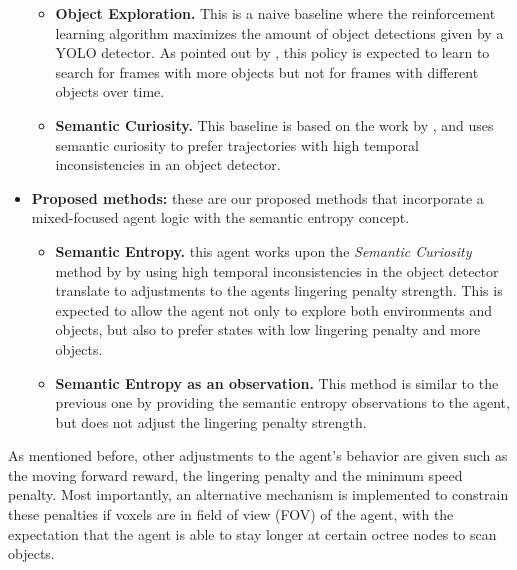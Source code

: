 \begin{itemize}
\begin{itemize}
        \item \textbf{Object Exploration.} This is a naive baseline where the reinforcement learning algorithm maximizes the amount of object detections given by a YOLO detector. As pointed out by \textcite{chaplot2020semantic}, this policy is expected to learn to search for frames with more objects but not for frames with different objects over time.
        \item \textbf{Semantic Curiosity.} This baseline is based on the work by \textcite{chaplot2020semantic}, and uses semantic curiosity to prefer trajectories with high temporal inconsistencies in an object detector. 
    \end{itemize}
    \item \textbf{Proposed methods:} these are our proposed methods that incorporate a mixed-focused agent logic with the semantic entropy concept.
        \begin{itemize}
            \item \textbf{Semantic Entropy.} this agent works upon the \textit{Semantic Curiosity} method by \textcite{chaplot2020semantic} by using high temporal inconsistencies in the object detector translate to adjustments to the agents lingering penalty strength. This is expected to allow the agent not only to explore both environments and objects, but also to prefer states with low lingering penalty and more objects.
            \item \textbf{Semantic Entropy as an observation.} This method is similar to the previous one by providing the semantic entropy observations to the agent, but does not adjust the lingering penalty strength.
        \end{itemize}
\end{itemize}

As mentioned before, other adjustments to the agent's behavior are given such as the moving forward reward, the lingering penalty and the minimum speed penalty. Most importantly, an alternative mechanism is implemented to constrain these penalties if voxels are in field of view (FOV) of the agent, with the expectation that the agent is able to stay longer at certain octree nodes to scan objects. 

